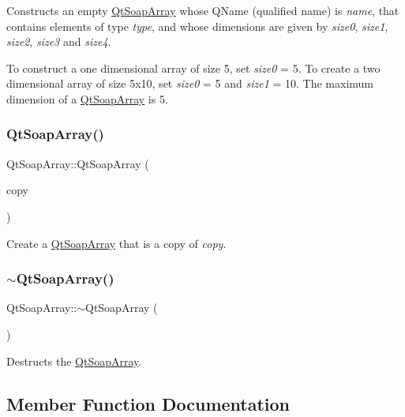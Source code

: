 Constructs an empty \mbox{\hyperlink{class_qt_soap_array}{Qt\+Soap\+Array}} whose Q\+Name (qualified name) is {\itshape name}, that contains elements of type {\itshape type}, and whose dimensions are given by {\itshape size0}, {\itshape size1}, {\itshape size2}, {\itshape size3} and {\itshape size4}.

To construct a one dimensional array of size 5, set {\itshape size0} = 5. To create a two dimensional array of size 5x10, set {\itshape size0} = 5 and {\itshape size1} = 10. The maximum dimension of a \mbox{\hyperlink{class_qt_soap_array}{Qt\+Soap\+Array}} is 5. \mbox{\label{class_qt_soap_array_a8d501105f8ef84967d6833acd021cc37}} 
\subsubsection{\texorpdfstring{Qt\+Soap\+Array()}{QtSoapArray()}\hspace{0.1cm}{\footnotesize\ttfamily [3/3]}}
{\footnotesize\ttfamily Qt\+Soap\+Array\+::\+Qt\+Soap\+Array (\begin{DoxyParamCaption}\item[{const \mbox{\hyperlink{class_qt_soap_array}{Qt\+Soap\+Array}} \&}]{copy }\end{DoxyParamCaption})}

Create a \mbox{\hyperlink{class_qt_soap_array}{Qt\+Soap\+Array}} that is a copy of {\itshape copy}. \mbox{\label{class_qt_soap_array_a545ceca740be6850e510e4c9b98e4591}} 
\subsubsection{\texorpdfstring{$\sim$\+Qt\+Soap\+Array()}{~QtSoapArray()}}
{\footnotesize\ttfamily Qt\+Soap\+Array\+::$\sim$\+Qt\+Soap\+Array (\begin{DoxyParamCaption}{ }\end{DoxyParamCaption})}

Destructs the \mbox{\hyperlink{class_qt_soap_array}{Qt\+Soap\+Array}}. 

\subsection{Member Function Documentation}
\mbox{\label{class_qt_soap_array_a52d39a5ffe682ccb5c9196654136fe96}} 
